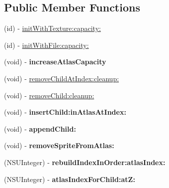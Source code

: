 \subsection*{Public Member Functions}
\begin{DoxyCompactItemize}
\item 
(id) -\/ \hyperlink{interface_c_c_sprite_batch_node_a9b3a35368eeb5f70e0df48b59b91163a}{init\-With\-Texture\-:capacity\-:}
\item 
(id) -\/ \hyperlink{interface_c_c_sprite_batch_node_ae89355622487734bb138425ec63e6f29}{init\-With\-File\-:capacity\-:}
\item 
\hypertarget{interface_c_c_sprite_batch_node_a5c65789127304cc11b2eb9eea3e8852d}{(void) -\/ {\bfseries increase\-Atlas\-Capacity}}\label{interface_c_c_sprite_batch_node_a5c65789127304cc11b2eb9eea3e8852d}

\item 
(void) -\/ \hyperlink{interface_c_c_sprite_batch_node_a1fe3a46b0e45ee516faed184dfbfc02d}{remove\-Child\-At\-Index\-:cleanup\-:}
\item 
(void) -\/ \hyperlink{interface_c_c_sprite_batch_node_a52cd6084a31e7b98fef0931fcf18b7db}{remove\-Child\-:cleanup\-:}
\item 
\hypertarget{interface_c_c_sprite_batch_node_abe886ba9fcb396235ea9c39651c59ad6}{(void) -\/ {\bfseries insert\-Child\-:in\-Atlas\-At\-Index\-:}}\label{interface_c_c_sprite_batch_node_abe886ba9fcb396235ea9c39651c59ad6}

\item 
\hypertarget{interface_c_c_sprite_batch_node_ab167032d11f98d7e23d1d24d7500450f}{(void) -\/ {\bfseries append\-Child\-:}}\label{interface_c_c_sprite_batch_node_ab167032d11f98d7e23d1d24d7500450f}

\item 
\hypertarget{interface_c_c_sprite_batch_node_acd6e2a7933a5db4831b534b8a25a44a9}{(void) -\/ {\bfseries remove\-Sprite\-From\-Atlas\-:}}\label{interface_c_c_sprite_batch_node_acd6e2a7933a5db4831b534b8a25a44a9}

\item 
\hypertarget{interface_c_c_sprite_batch_node_a4756f9d7261773793169b16a34c44e22}{(N\-S\-U\-Integer) -\/ {\bfseries rebuild\-Index\-In\-Order\-:atlas\-Index\-:}}\label{interface_c_c_sprite_batch_node_a4756f9d7261773793169b16a34c44e22}

\item 
\hypertarget{interface_c_c_sprite_batch_node_aba7fd259c438bc63cdcc41ccc4e5d46e}{(N\-S\-U\-Integer) -\/ {\bfseries atlas\-Index\-For\-Child\-:at\-Z\-:}}\label{interface_c_c_sprite_batch_node_aba7fd259c438bc63cdcc41ccc4e5d46e}


\end{DoxyCompactItemize}
